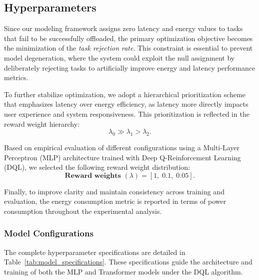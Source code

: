 \documentclass[preprint,3p,authoryear]{elsarticle}
\begin{document}
\subsection{Hyperparameters}\label{subsec:hyperparameters}


Since our modeling framework assigns zero latency and energy values to tasks that fail to be successfully offloaded, the primary optimization objective becomes the minimization of the \emph{task rejection rate}. This constraint is essential to prevent model degeneration, where the system could exploit the null assignment by deliberately rejecting tasks to artificially improve energy and latency performance metrics.

To further stabilize optimization, we adopt a hierarchical prioritization scheme that emphasizes latency over energy efficiency, as latency more directly impacts user experience and system responsiveness. This prioritization is reflected in the reward weight hierarchy:
\[
\lambda_0 \gg \lambda_1 > \lambda_2.
\]

Based on empirical evaluation of different configurations using a Multi-Layer Perceptron (MLP) architecture trained with Deep Q-Reinforcement Learning (DQL), we selected the following reward weight distribution:
\[
\textbf{Reward weights } (\lambda) = [1,\; 0.1,\; 0.05].
\]

Finally, to improve clarity and maintain consistency across training and evaluation, the energy consumption metric is reported in terms of power consumption throughout the experimental analysis.


\subsubsection{Model Configurations}

The complete hyperparameter specifications are detailed in Table~\ref{tab:model_specifications}. These specifications guide the architecture and training of both the MLP and Transformer models under the DQL algorithm.


\begin{table}[H]
\centering

\caption{Model Specifications}\label{tab:model_specifications}
\end{table}
\end{document}
